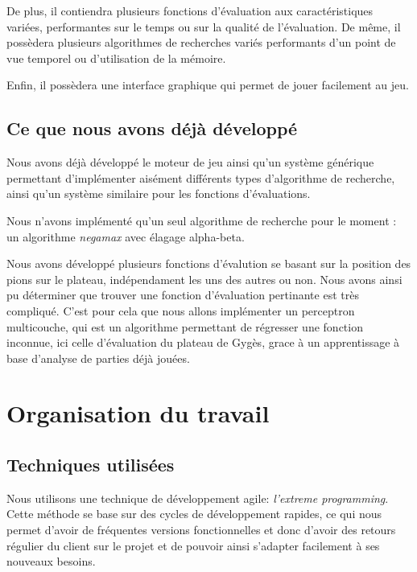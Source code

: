 \documentclass[a4paper]{article}
\begin{document}
		\vspace{1em}
		De plus, il contiendra plusieurs fonctions d'évaluation aux caractéristiques variées, performantes sur
		le temps ou sur la qualité de l'évaluation. De même, il possèdera plusieurs algorithmes de recherches
		variés performants d'un point de vue temporel
		ou d'utilisation de la mémoire.

		\vspace{1em}
		Enfin, il possèdera une interface graphique qui permet de jouer facilement au jeu.

	\subsection{Ce que nous avons déjà développé}
		Nous avons déjà développé le moteur de jeu ainsi qu'un système générique permettant d'implémenter
		aisément différents types d'algorithme de recherche, ainsi qu'un système similaire pour les
		fonctions d'évaluations.

		\vspace{1em}
		Nous n'avons implémenté qu'un seul algorithme de recherche pour le moment :
		un algorithme \emph{negamax} avec élagage alpha-beta.

		\vspace{1em}
		Nous avons développé plusieurs fonctions d'évalution se basant sur la position des pions sur le plateau,
		indépendament les uns des autres ou non. Nous avons ainsi pu déterminer que trouver une fonction d'évaluation
		pertinante est très compliqué. C'est pour cela que nous allons implémenter un perceptron multicouche, qui est un
		algorithme permettant de régresser une fonction inconnue, ici celle d'évaluation du plateau de Gygès, grace à un
		apprentissage à base d'analyse de parties déjà jouées.

\section{Organisation du travail}
	\subsection{Techniques utilisées}
		Nous utilisons une technique de développement agile: \emph{l'extreme programming}. Cette méthode se
		base sur des cycles de développement rapides, ce qui nous permet d'avoir de fréquentes versions
		fonctionnelles et donc d'avoir des retours régulier du client sur le projet et de pouvoir ainsi
		s'adapter facilement à ses nouveaux besoins.
\end{document}
